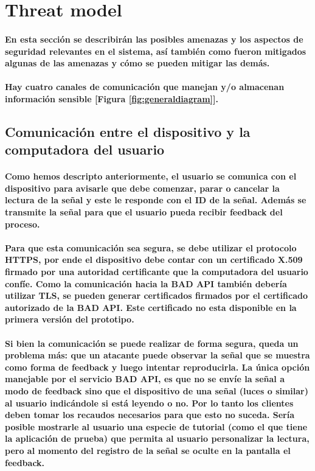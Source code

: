 \documentclass{article}
\begin{document}
\section{Threat model}
\paragraph{
En esta sección se describirán las posibles amenazas y los aspectos de seguridad relevantes en el sistema, así también como fueron mitigados algunas de las amenazas y cómo se pueden mitigar las demás.
}
\paragraph{
Hay cuatro canales de comunicación que manejan y/o almacenan información sensible [Figura \ref{fig:generaldiagram}].
}

\subsection{Comunicación entre el dispositivo y la computadora del usuario}
\paragraph{
Como hemos descripto anteriormente, el usuario se comunica con el dispositivo para avisarle que debe comenzar, parar o cancelar la lectura de la señal y este le responde con el ID de la señal. Además se transmite la señal para que el usuario pueda recibir feedback del proceso.
}
\paragraph{
Para que esta comunicación sea segura, se debe utilizar el protocolo HTTPS, por ende el dispositivo debe contar con un certificado X.509 firmado por una autoridad certificante que la computadora del usuario confíe. Como la comunicación hacia la BAD API también debería utilizar TLS, se pueden generar certificados firmados por el certificado autorizado de la BAD API. Este certificado no esta disponible en la primera versión del prototipo.
}
\paragraph{
Si bien la comunicación se puede realizar de forma segura, queda un problema más: que un atacante puede observar la señal que se muestra como forma de feedback y luego intentar reproducirla. La única opción manejable por el servicio BAD API, es que no se envíe la señal a modo de feedback sino que el dispositivo de una señal (luces o similar) al usuario indicándole si está leyendo o no. Por lo tanto los clientes deben tomar los recaudos necesarios para que esto no suceda. Sería posible mostrarle al usuario una especie de tutorial (como el que tiene la aplicación de prueba) que permita al usuario personalizar la lectura, pero al momento del registro de la señal se oculte en la pantalla el feedback.
}
\end{document}
